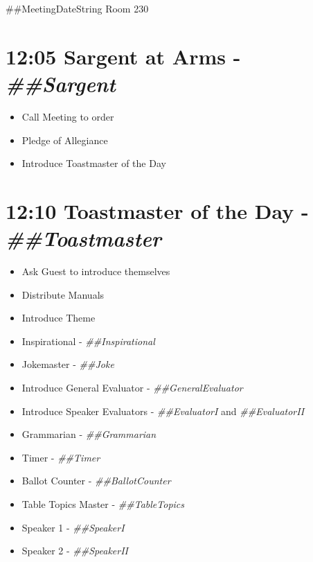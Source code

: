 \documentclass{article}
\newcommand{\meetingDateString}{##MeetingDateString}
\newcommand{\toastmaster}{##Toastmaster}
\newcommand{\sargent}{##Sargent}
\newcommand{\tableTopics}{##TableTopics}
\newcommand{\generalEvaluator}{##GeneralEvaluator}
\newcommand{\evaluatorI}{##EvaluatorI}
\newcommand{\evaluatorII}{##EvaluatorII}
\newcommand{\speakerI}{##SpeakerI}
\newcommand{\speakerII}{##SpeakerII}
\newcommand{\grammarian}{##Grammarian}
\newcommand{\timer}{##Timer}
\newcommand{\inspirational}{##Inspirational}
\newcommand{\ballotCounter}{##BallotCounter}
\newcommand{\joke}{##Joke}
\begin{document}
{}
{}
{\centering \meetingDateString{} Room 230 \\}

\begin{spacing}{.6}

\section*{12:05 Sargent at Arms - \textit{\sargent{}}}
\begin{itemize}
  \item Call Meeting to order
  \item Pledge of Allegiance
  \item Introduce Toastmaster of the Day
\end{itemize}

\section*{12:10 Toastmaster of the Day - \textit{\toastmaster{}}} 
\begin{itemize}
  \item Ask Guest to introduce themselves
  \item Distribute Manuals
  \item Introduce Theme
  \item Inspirational - \textit{\inspirational{}}
  \item Jokemaster - \textit{\joke{}}
  \item Introduce General Evaluator - \textit{\generalEvaluator{}}
  \item Introduce Speaker Evaluators - \textit{\evaluatorI{}} and \textit{\evaluatorII{}}
  \item Grammarian - \textit{\grammarian{}}
  \item Timer - \textit{\timer{}}
  \item Ballot Counter - \textit{\ballotCounter{}}
  \item Table Topics Master - \textit{\tableTopics{}}
  \item Speaker 1 - \textit{\speakerI{}}
  \item Speaker 2 - \textit{\speakerII{}}
\end{itemize}


\end{spacing}
\end{document}

